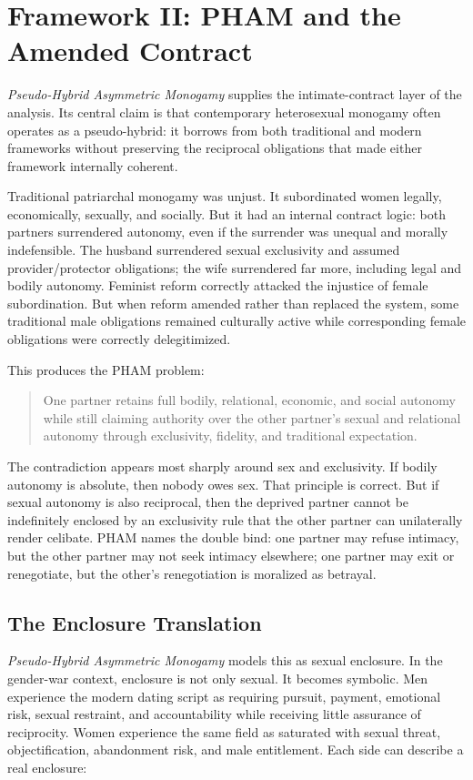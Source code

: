 \documentclass[12pt]{article}
\newcommand{\PHAM}{\textit{Pseudo-Hybrid Asymmetric Monogamy}}
\begin{document}
\section{Framework II: PHAM and the Amended Contract}

\PHAM{} supplies the intimate-contract layer of the analysis. Its central claim is that contemporary heterosexual monogamy often operates as a pseudo-hybrid: it borrows from both traditional and modern frameworks without preserving the reciprocal obligations that made either framework internally coherent.

Traditional patriarchal monogamy was unjust. It subordinated women legally, economically, sexually, and socially. But it had an internal contract logic: both partners surrendered autonomy, even if the surrender was unequal and morally indefensible. The husband surrendered sexual exclusivity and assumed provider/protector obligations; the wife surrendered far more, including legal and bodily autonomy. Feminist reform correctly attacked the injustice of female subordination. But when reform amended rather than replaced the system, some traditional male obligations remained culturally active while corresponding female obligations were correctly delegitimized.

This produces the PHAM problem:

\begin{quote}
One partner retains full bodily, relational, economic, and social autonomy while still claiming authority over the other partner's sexual and relational autonomy through exclusivity, fidelity, and traditional expectation.
\end{quote}

The contradiction appears most sharply around sex and exclusivity. If bodily autonomy is absolute, then nobody owes sex. That principle is correct. But if sexual autonomy is also reciprocal, then the deprived partner cannot be indefinitely enclosed by an exclusivity rule that the other partner can unilaterally render celibate. PHAM names the double bind: one partner may refuse intimacy, but the other partner may not seek intimacy elsewhere; one partner may exit or renegotiate, but the other's renegotiation is moralized as betrayal.

\subsection{The Enclosure Translation}

\PHAM{} models this as sexual enclosure. In the gender-war context, enclosure is not only sexual. It becomes symbolic. Men experience the modern dating script as requiring pursuit, payment, emotional risk, sexual restraint, and accountability while receiving little assurance of reciprocity. Women experience the same field as saturated with sexual threat, objectification, abandonment risk, and male entitlement. Each side can describe a real enclosure:
\end{document}

